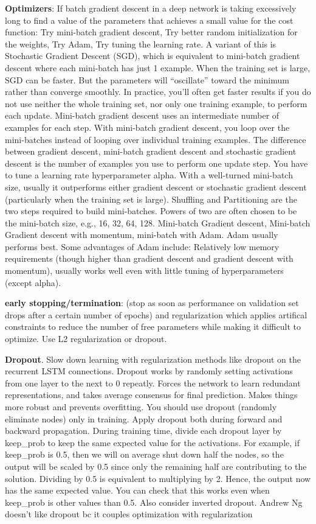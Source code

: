 \documentclass[]{book}
\begin{document}
\textbf{Optimizers}: If batch gradient descent in a deep network is taking excessively long to find a value of the parameters that achieves a small value for the cost function: Try mini-batch gradient descent, Try better random initialization for the weights, Try Adam, Try tuning the learning rate. A variant of this is Stochastic Gradient Descent (SGD), which is equivalent to mini-batch gradient descent where each mini-batch has just 1 example. When the training set is large, SGD can be faster. But the parameters will ``oscillate'' toward the minimum rather than converge smoothly. In practice, you'll often get faster results if you do not use neither the whole training set, nor only one training example, to perform each update. Mini-batch gradient descent uses an intermediate number of examples for each step. With mini-batch gradient descent, you loop over the mini-batches instead of looping over individual training examples. The difference between gradient descent, mini-batch gradient descent and stochastic gradient descent is the number of examples you use to perform one update step. You have to tune a learning rate hyperparameter alpha. With a well-turned mini-batch size, usually it outperforms either gradient descent or stochastic gradient descent (particularly when the training set is large). Shuffling and Partitioning are the two steps required to build mini-batches. Powers of two are often chosen to be the mini-batch size, e.g., 16, 32, 64, 128. Mini-batch Gradient descent, Mini-batch Gradient descent with momentum, mini-batch with Adam. Adam usually performs best. Some advantages of Adam include: Relatively low memory requirements (though higher than gradient descent and gradient descent with momentum), usually works well even with little tuning of hyperparameters (except alpha).

\textbf{early stopping/termination}: (stop as soon as performance on validation set drops after a certain number of epochs) and regularization which applies artifical constraints to reduce the number of free parameters while making it difficult to optimize. Use L2 regularization or dropout.

\textbf{Dropout}. Slow down learning with regularization methods like dropout on the recurrent LSTM connections. Dropout works by randomly setting activations from one layer to the next to 0 repeatly. Forces the network to learn redundant representations, and takes average consensus for final prediction. Makes things more robust and prevents overfitting. You should use dropout (randomly eliminate nodes) only in training. Apply dropout both during forward and backward propagation. During training time, divide each dropout layer by keep\_prob to keep the same expected value for the activations. For example, if keep\_prob is 0.5, then we will on average shut down half the nodes, so the output will be scaled by 0.5 since only the remaining half are contributing to the solution. Dividing by 0.5 is equivalent to multiplying by 2. Hence, the output now has the same expected value. You can check that this works even when keep\_prob is other values than 0.5. Also consider inverted dropout. Andrew Ng doesn't like dropout bc it couples optimization with regularization
\end{document}
